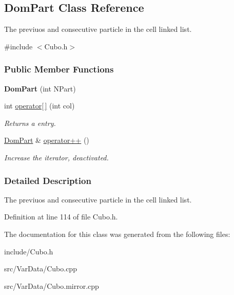 \hypertarget{classDomPart}{\subsection{\-Dom\-Part \-Class \-Reference}
\label{classDomPart}
}


\-The previuos and consecutive particle in the cell linked list.  




{\ttfamily \#include $<$\-Cubo.\-h$>$}

\subsubsection*{\-Public \-Member \-Functions}
\begin{DoxyCompactItemize}
\item 
\hypertarget{classDomPart_ab2a1821c2ce0c7963f55101016fb438d}{{\bfseries \-Dom\-Part} (int \-N\-Part)}\label{classDomPart_ab2a1821c2ce0c7963f55101016fb438d}

\item 
\hypertarget{classDomPart_a72c73510fb6bfedfb82d906895bdaf07}{int \hyperlink{classDomPart_a72c73510fb6bfedfb82d906895bdaf07}{operator\mbox{[}$\,$\mbox{]}} (int col)}\label{classDomPart_a72c73510fb6bfedfb82d906895bdaf07}

\begin{DoxyCompactList}\small\item\em \-Returns a entry. \end{DoxyCompactList}\item 
\hypertarget{classDomPart_a580c80d8a662e0f4c16d04778d140dda}{\hyperlink{classDomPart}{\-Dom\-Part} \& \hyperlink{classDomPart_a580c80d8a662e0f4c16d04778d140dda}{operator++} ()}\label{classDomPart_a580c80d8a662e0f4c16d04778d140dda}

\begin{DoxyCompactList}\small\item\em \-Increase the iterator, deactivated. \end{DoxyCompactList}\end{DoxyCompactItemize}


\subsubsection{\-Detailed \-Description}
\-The previuos and consecutive particle in the cell linked list. 

\-Definition at line 114 of file \-Cubo.\-h.



\-The documentation for this class was generated from the following files\-:\begin{DoxyCompactItemize}
\item 
include/\-Cubo.\-h\item 
src/\-Var\-Data/\-Cubo.\-cpp\item 
src/\-Var\-Data/\-Cubo.\-mirror.\-cpp\end{DoxyCompactItemize}
